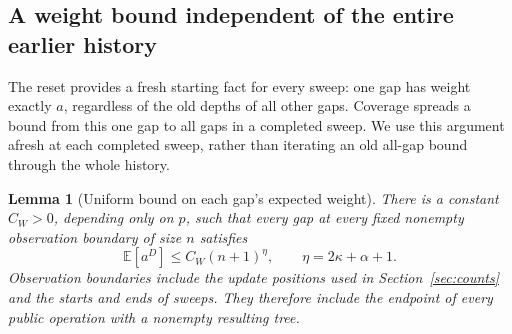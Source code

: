 \documentclass[11pt,a4paper]{article}
\theoremstyle{readable}
\newtheorem{lemma}[theorem]{Lemma}
\newcommand{\E}{\mathbb E}
\begin{document}
\subsection{A weight bound independent of the entire earlier history}
\label{sec:uniform}

The reset provides a fresh starting fact for every sweep: one gap has
weight exactly $a$, regardless of the old depths of all other gaps.
Coverage spreads a bound from this one gap to all gaps in a completed
sweep. We use this argument afresh at each completed sweep, rather than
iterating an old all-gap bound through the whole history.

\begin{lemma}[Uniform bound on each gap's expected weight]
\label{lem:uniform}
There is a constant $C_W>0$, depending only on $p$, such that every
gap at every fixed nonempty observation boundary of size $n$ satisfies
\[
  \E[a^D]\le C_W(n+1)^\eta,
  \qquad \eta=2\kappa+\alpha+1.
\]
Observation boundaries include the update positions used in
Section~\ref{sec:counts} and the starts and ends of sweeps. They
therefore include the endpoint of every public operation with a
nonempty resulting tree.
\end{lemma}
\end{document}
